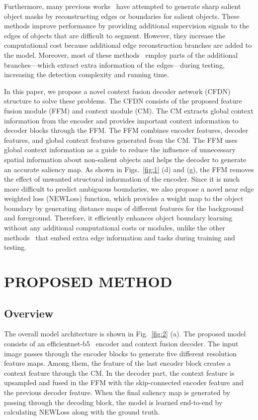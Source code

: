 \documentclass{article}
\begin{document}
Furthermore, many previous works~\cite{wang2019salient, zhao2019egnet, su2019selectivity, wei2020label} have attempted to generate sharp salient object masks by reconstructing edges or boundaries for salient objects. These methods improve performance by providing additional supervision signals to the edges of objects that are difficult to segment. However, they increase the computational cost because additional edge reconstruction branches are added to the model. Moreover, most of these methods~\cite{wang2019salient, zhao2019egnet, su2019selectivity} employ parts of the additional branches—which extract extra information of the edges—during testing, increasing the detection complexity and running time.

In this paper, we propose a novel context fusion decoder network (CFDN) structure to solve these problems. The CFDN consists of the proposed feature fusion module (FFM) and context module (CM). The CM extracts global context information from the encoder and provides important context information to decoder blocks through the FFM. The FFM combines encoder features, decoder features, and global context features generated from the CM. The FFM uses global context information as a guide to reduce the influence of unnecessary spatial information about non-salient objects and helps the decoder to generate an accurate saliency map. As shown in Figs.~\ref{fig:1} (d) and (g), the FFM removes the effect of unwanted structural information of the encoder. Since it is much more difficult to predict ambiguous boundaries, we also propose a novel near edge weighted loss (NEWLoss) function, which provides a weight map to the object boundary by generating distance maps of different features for the background and foreground. Therefore, it efficiently enhances object boundary learning without any additional computational costs or modules, unlike the other methods~\cite{wang2019salient, zhao2019egnet, su2019selectivity, wei2020label} that embed extra edge information and tasks during training and testing.

\vspace{-0.3cm}
\section{PROPOSED METHOD}
\vspace{-0.2cm}
\subsection{Overview}
\vspace{-0.1cm}
The overall model architecture is shown in Fig.~\ref{fig:2} (a). The proposed model consists of an efficientnet-b5~\cite{tan2019efficientnet} encoder and context fusion decoder. The input image passes through the encoder blocks to generate five different resolution feature maps. Among them, the feature of the last encoder block creates a context feature through the CM. In the decoder part, the context feature is upsampled and fused in the FFM with the skip-connected encoder feature and the previous decoder feature. When the final saliency map is generated by passing through the decoding block, the model is learned end-to-end by calculating NEWLoss along with the ground truth.
\end{document}
